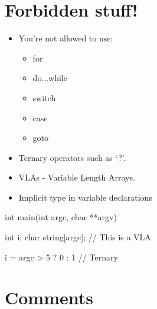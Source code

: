 \documentclass{42-en}
\begin{document}
    \section{Forbidden stuff!}

        \begin{itemize}

            \item You're not allowed to use:

                \begin{itemize}

                    \item for
                    \item do...while
                    \item switch
                    \item case
                    \item goto

                \end{itemize}

            \item Ternary operators such as `?'.

            \item VLAs - Variable Length Arrays.

            \item Implicit type in variable declarations

        \end{itemize}
        \begin{42ccode}
    int main(int argc, char **argv)
    {
        int     i;
        char    string[argc]; // This is a VLA

        i = argc > 5 ? 0 : 1 // Ternary
    }
        \end{42ccode}
        \newpage

    \section{Comments}
\end{document}
